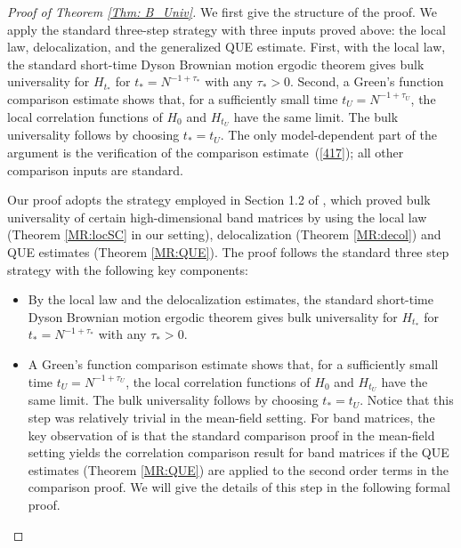 \documentclass[10pt,reqno]{article}
\theoremstyle{plain} %
\theoremstyle{remark}
\numberwithin{equation}{section}
\begin{document}
 \begin{proof}[Proof of Theorem \ref{Thm: B_Univ}]\begingroup
We first give the structure of the proof. We apply the standard three-step strategy with three inputs proved above:
the local law, delocalization, and the generalized QUE estimate.
 First, with the local law, the standard short-time
Dyson Brownian motion ergodic theorem  gives bulk universality for \(H_{t_*}\) for 
\(t_*=N^{-1+\tau_*}\) with any $\tau_*> 0$.  Second, a Green's function comparison estimate shows
that, for a sufficiently small time \(t_U=N^{-1+\tau_U}\), the local
correlation functions of \(H_0\) and \(H_{t_U}\) have the same limit.
The bulk universality follows by choosing  \(t_*=t_U\).
The only model-dependent part of the argument is the verification of the
comparison estimate~(\ref*{417}); all other comparison inputs are standard.
\par\endgroup

Our proof adopts the strategy employed in Section 1.2 of \cite{Xu:2024aa}, which proved bulk universality
of  certain high-dimensional band matrices by using 
the local law (Theorem \ref{MR:locSC} in our setting), 
delocalization (Theorem \ref{MR:decol}) 
and QUE estimates (Theorem \ref{MR:QUE}). The proof follows the standard three step strategy with the following key components: 

\begin{itemize}
    \item By the local law and the delocalization estimates, the standard short-time
Dyson Brownian motion ergodic theorem gives bulk universality for \(H_{t_*}\) for 
\(t_*=N^{-1+\tau_*}\) with any $\tau_*> 0$.

\item A Green's function comparison estimate shows
that, for a sufficiently small time \(t_U=N^{-1+\tau_U}\), the local
correlation functions of \(H_0\) and \(H_{t_U}\) have the same limit.
The bulk universality follows by choosing  \(t_*=t_U\).
Notice that this step was relatively trivial in the mean-field setting. For band matrices, the key observation of \cite{Xu:2024aa} is that the standard comparison proof in the mean-field setting yields the 
correlation comparison result for band matrices if  the  QUE estimates (Theorem \ref{MR:QUE}) are applied to the second order terms in the comparison proof. We will give the details of this step in the following formal proof.  

\end{itemize}




\end{proof}
\end{document}

